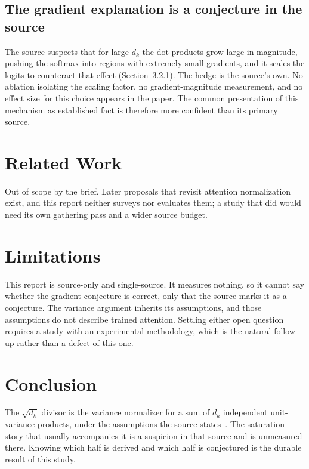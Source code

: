 \documentclass[11pt]{article}
\begin{document}
\subsection{The gradient explanation is a conjecture in the source}

The source suspects that for large $d_k$ the dot products grow large in
magnitude, pushing the softmax into regions with extremely small gradients,
and it scales the logits to counteract that effect (Section~3.2.1). The hedge
is the source's own. No ablation isolating the scaling factor, no
gradient-magnitude measurement, and no effect size for this choice appears in
the paper. The common presentation of this mechanism as established fact is
therefore more confident than its primary source.

\section{Related Work}

Out of scope by the brief. Later proposals that revisit attention
normalization exist, and this report neither surveys nor evaluates them; a
study that did would need its own gathering pass and a wider source budget.

\section{Limitations}

This report is source-only and single-source. It measures nothing, so it
cannot say whether the gradient conjecture is correct, only that the source
marks it as a conjecture. The variance argument inherits its assumptions, and
those assumptions do not describe trained attention. Settling either open
question requires a study with an experimental methodology, which is the
natural follow-up rather than a defect of this one.

\section{Conclusion}

The $\sqrt{d_k}$ divisor is the variance normalizer for a sum of $d_k$
independent unit-variance products, under the assumptions the source
states~\citep{vaswani2017attention}. The saturation story that usually
accompanies it is a suspicion in that source and is unmeasured there. Knowing
which half is derived and which half is conjectured is the durable result of
this study.



\end{document}
